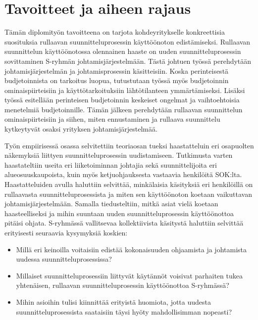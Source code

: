 \documentclass[12pt,a4paper,oneside,pdftex]{report}
\begin{document}
\section{Tavoitteet ja aiheen rajaus}
\label{section:tavoitteet}

Tämän diplomityön tavoitteena on tarjota kohdeyritykselle konkreettisia suosituksia rullaavan suunnitteluprosessin käyttöönoton edistämiseksi. Rullaavan suunnittelun käyttöönotossa olennainen haaste on uuden suunnitteluprosessin sovittaminen S-ryhmän johtamisjärjestelmään. Tästä johtuen työssä perehdytään johtamisjärjestelmän ja johtamisprosessin käsitteisiin. Koska perinteisestä budjetoinnista on tarkoitus luopua, tutustutaan työssä myös budjetoinnin ominaispiirteisiin ja käyttötarkoituksiin lähtötilanteen ymmärtämiseksi. Lisäksi työssä esitellään perinteisen budjetoinnin keskeiset ongelmat ja vaihtoehtoisia menetelmiä budjetoinnille. Tämän jälkeen perehdytään rullaavan suunnittelun ominaispiirteisiin ja siihen, miten ennustaminen ja rullaava suunnittelu kytkeytyvät osaksi yrityksen johtamisjärjestelmää.

Työn empiirisessä osassa selvitettiin teoriaosan tueksi haastatteluin eri osapuolten näkemyksiä liittyen suunnitteluprosessin uudistamiseen. Tutkimusta varten haastateltiin useita eri liiketoiminnan johtajia sekä suunnittelijoita eri alueosuuskaupoista, kuin myös ketjuohjauksesta vastaavia henkilöitä SOK:lta. Haastatteluiden avulla haluttiin selvittää, minkälaisia käsityksiä eri henkilöillä on rullaavasta suunnitteluprosessista ja miten sen käyttöönoton koetaan vaikuttavan johtamisjärjestelmään. Samalla tiedusteltiin, mitkä asiat vielä koetaan haasteelliseksi ja mihin suuntaan uuden suunnitteluprosessin käyttöönottoa pitäisi ohjata. S-ryhmässä vallitsevaa kollektiivista käsitystä haluttiin selvittää erityisesti seuraavia kysymyksiä koskien:

\begin{itemize}
\setlength{\itemsep}{0pt}
\item Millä eri keinoilla voitaisiin edistää kokonaisuuden ohjaamista ja johtamista uudessa suunnitteluprosessissa?
\item Millaiset suunnitteluprosessiin liittyvät käytännöt voisivat parhaiten tukea yhtenäisen, rullaavan suunnitteluprosessin käyttöönottoa S-ryhmässä?
\item Mihin asioihin tulisi kiinnittää erityistä huomiota, jotta uudesta suunnitteluprosessista saataisiin täysi hyöty mahdollisimman nopeasti?
\end{itemize}
\end{document}
